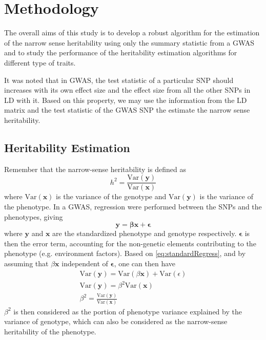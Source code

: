 	\section{Methodology}	
		The overall aims of this study is to develop a robust algorithm for the estimation of the narrow sense heritability using only the summary statistic from a \gls{GWAS} and to study the performance of the heritability estimation algorithms for different type of traits.
		
		It was noted that in \gls{GWAS}, the test statistic of a particular \gls{SNP} should increases with its own effect size and the effect size from all the other \glspl{SNP} in \gls{LD} with it.
		Based on this property, we may use the information from the \gls{LD} matrix and the test statistic of the \gls{GWAS} \gls{SNP} the estimate the narrow sense heritability.
		
		
		\subsection{Heritability Estimation}
			Remember that the narrow-sense heritability is defined as 
			$$
				h^2 = \frac{\mathrm{Var}(\boldsymbol{y})}{\mathrm{Var}(\boldsymbol{x})}
			$$
			where $\mathrm{Var}(\boldsymbol{x})$ is the variance of the genotype and $\mathrm{Var}(\boldsymbol{y})$ is the variance of the phenotype.
			In a \gls{GWAS}, regression were performed between the \glspl{SNP} and the phenotypes, giving
			\begin{equation}
				\boldsymbol{y}=\boldsymbol{\beta x}+\boldsymbol{\epsilon}
				\label{eq:standardRegress}
			\end{equation}
			where $\boldsymbol{y}$ and $\boldsymbol{x}$ are the standardized phenotype and genotype respectively. 
			$\boldsymbol{\epsilon}$ is then the error term, accounting for the non-genetic elements contributing to the phenotype (e.g. environment factors).
			Based on \cref{eq:standardRegress}, and by assuming that $\beta \boldsymbol{x}$ independent of $\boldsymbol{\epsilon}$, one can then have
			\begin{align}
				\mathrm{Var}(\boldsymbol{y}) = \mathrm{Var}(\beta \boldsymbol{x})+ \mathrm{Var}(\epsilon) \nonumber\\
				\mathrm{Var}(\boldsymbol{y}) = \beta^2\mathrm{Var}(\boldsymbol{x}) \nonumber\\
				\beta^2= \frac{\mathrm{Var}(\boldsymbol{y})}{\mathrm{Var}(\boldsymbol{x})}
				\label{eq:betaHeri}
			\end{align}
			$\beta^2$ is then considered as the portion of phenotype variance explained by the variance of genotype, which can also be considered as the narrow-sense heritability of the phenotype.
					
